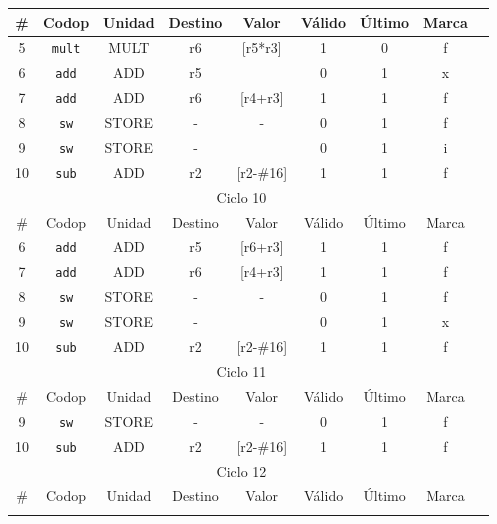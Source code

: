\begin{ejercicio}
\begin{table}[H]
\begin{tabular}{|c|c|c|c|c|c|c|c|c|}
            \hline
            \# & Codop      & Unidad & Destino & Valor & Válido & Último & Marca \\ \hline
            5  & \verb|mult|& MULT   & r6      & [r5*r3] & 1    & 0      & f     \\ \hline
            6  & \verb|add| & ADD    & r5      &       & 0      & 1      & x     \\ \hline
            7  & \verb|add| & ADD    & r6      & [r4+r3]  & 1   & 1      & f     \\ \hline
            8  & \verb|sw|  & STORE  & -       &  -    & 0      & 1      & f     \\ \hline
            9  & \verb|sw|  & STORE  & -       &       & 0      & 1      & i     \\ \hline
            10 & \verb|sub| & ADD    & r2      & [r2-\#16] & 1  & 1      & f     \\ \hline\hline
            \multicolumn{8}{|c|}{Ciclo 10} \\
            \hline
            \# & Codop      & Unidad & Destino & Valor & Válido & Último & Marca \\ \hline
            6  & \verb|add| & ADD    & r5      & [r6+r3] & 1    & 1      & f     \\ \hline
            7  & \verb|add| & ADD    & r6      & [r4+r3] & 1    & 1      & f     \\ \hline
            8  & \verb|sw|  & STORE  & -       & -     & 0      & 1      & f     \\ \hline
            9  & \verb|sw|  & STORE  & -       &       & 0      & 1      & x     \\ \hline
            10 & \verb|sub| & ADD    & r2      & [r2-\#16] & 1  & 1      & f     \\ \hline\hline
            \multicolumn{8}{|c|}{Ciclo 11} \\
            \hline
            \# & Codop      & Unidad & Destino & Valor & Válido & Último & Marca \\ \hline
            9  & \verb|sw|  & STORE  & -       & -     & 0      & 1      & f     \\ \hline
            10 & \verb|sub| & ADD    & r2      & [r2-\#16] & 1  & 1      & f     \\ \hline\hline
            \multicolumn{8}{|c|}{Ciclo 12} \\
            \hline
            \# & Codop      & Unidad & Destino & Valor & Válido & Último & Marca \\ \hline
            \multicolumn{8}{|c|}{} \\
            \hline
        \end{tabular}
    \end{table}
\end{ejercicio}

